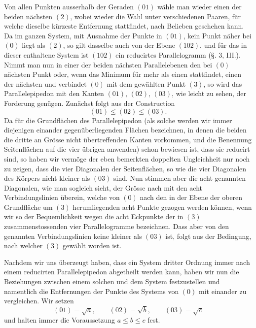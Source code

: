 \documentclass[11pt]{article}
\begin{document}
Von allen Punkten ausserhalb der Geraden $(01)$ wähle man wieder einen der beiden nächsten $(2)$, wobei wieder die Wahl unter verschiedenen Paaren, für welche dieselbe kürzeste Entfernung stattfindet, nach Belieben geschehen kann. Da im ganzen System, mit Ausnahme der Punkte in $(01)$, kein Punkt näher bei $(0)$ liegt als $(2)$, so gilt dasselbe auch von der Ebene $(102)$, und für das in dieser enthaltene System ist $(102)$ ein reducirtes Parallelogramm (§. 3, III.). Nimmt man nun in einer der beiden nächsten Parallelebenen den bei $(0)$ nächsten Punkt oder, wenn das Minimum für mehr als einen stattfindet, einen der nächsten und verbindet $(0)$ mit dem gewählten Punkt $(3)$, so wird das Parallelepipedon mit den Kanten $(01)$, $(02)$, $(03)$, wie leicht zu sehen, der Forderung genügen. Zunächst folgt aus der Construction
\[
 (01)\le (02)\le (03).
\]
Da für die Grundflächen des Parallelepipedon (als solche werden wir immer diejenigen einander gegenüberliegenden Flächen bezeichnen, in denen die beiden die dritte an Grösse nicht übertreffenden Kanten vorkommen, und die Benennung Seitenflächen auf die vier übrigen anwenden) schon bewiesen ist, dass sie reducirt sind, so haben wir vermöge der eben bemerkten doppelten Ungleichheit nur noch zu zeigen, dass die vier Diagonalen der Seitenflächen, so wie die vier Diagonalen des Körpers nicht kleiner als $(03)$ sind. Nun stimmen aber die acht genannten Diagonalen, wie man sogleich sieht, der Grösse nach mit den acht Verbindungslinien überein, welche von $(0)$ nach den in der Ebene der oberen Grundfläche um $(3)$ herumliegenden acht Punkte gezogen werden können, wenn wir so der Bequemlichkeit wegen die acht Eckpunkte der in $(3)$ zusammenstossenden vier Parallelogramme bezeichnen. Dass aber von den genannten Verbindungslinien keine kleiner als $(03)$ ist, folgt aus der Bedingung, nach welcher $(3)$ gewählt worden ist.

Nachdem wir uns überzeugt haben, dass ein System dritter Ordnung immer nach einem reducirten Parallelepipedon abgetheilt werden kann, haben wir nun die Beziehungen zwischen einem solchen und dem System festzustellen und namentlich die Entfernungen der Punkte des Systems von $(0)$ mit einander zu vergleichen. Wir setzen
\[
 (01)=\sqrt a,
\qquad (02)=\sqrt b,
\qquad (03)=\sqrt c
\]
und halten immer die Voraussetzung $a\le b\le c$ fest.
\end{document}
